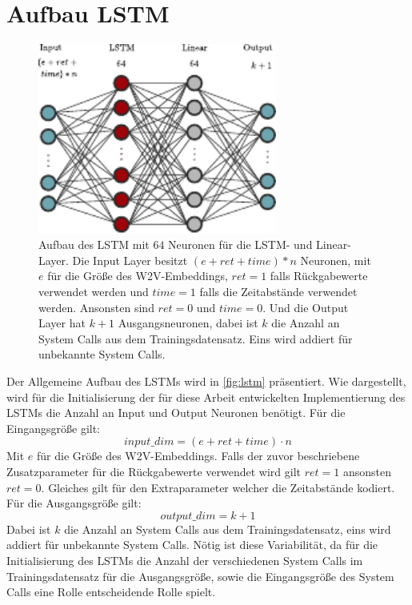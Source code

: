         \section{Aufbau LSTM}\label{sec:aufbau_lstm}
        \begin{figure}[ht]
            \centering
            \includegraphics[width=0.7\textwidth]{images/lstm.pdf}
            \caption{Aufbau des \ac{LSTM} mit $64$ Neuronen für die \ac{LSTM}- und Linear-Layer.
                Die Input Layer besitzt $(e + ret + time) * n$ Neuronen, mit $e$ für die Größe des \ac{W2V}-Embeddings,
                $ret=1$ falls Rückgabewerte verwendet werden und $time=1$ falls die Zeitabstände verwendet werden.
                Ansonsten sind $ret=0$ und $time=0$.
                Und die Output Layer hat $k+1$ Ausgangsneuronen, dabei ist $k$ die Anzahl an System Calls aus dem Trainingsdatensatz.
                Eins wird addiert für unbekannte System Calls.}
                \label{fig:lstm}
        \end{figure}

        Der Allgemeine Aufbau des \acp{LSTM} wird in \autoref{fig:lstm} präsentiert.
        Wie dargestellt, wird für die Initialisierung der für diese Arbeit entwickelten Implementierung des \acp{LSTM} die Anzahl an Input und Output Neuronen benötigt.
        Für die Eingangsgröße gilt:
        \begin{equation}
            input\_dim = (e + ret + time) \cdot n
        \end{equation}
        Mit $e$ für die Größe des \ac{W2V}-Embeddings.
        Falls der zuvor beschriebene Zusatzparameter für die Rückgabewerte verwendet wird gilt $ret=1$ ansonsten $ret=0$.
        Gleiches gilt für den Extraparameter welcher die Zeitabstände kodiert.
        Für die Ausgangsgröße gilt:
        \begin{equation}
            output\_dim = k + 1
        \end{equation}
        Dabei ist $k$ die Anzahl an System Calls aus dem Trainingsdatensatz, eins wird addiert für unbekannte System Calls.
        Nötig ist diese Variabilität, da für die Initialisierung des \acp{LSTM} die Anzahl der verschiedenen System Calls im Trainingsdatensatz für die Ausgangsgröße, sowie die Eingangsgröße des System Calls eine Rolle entscheidende Rolle spielt.

